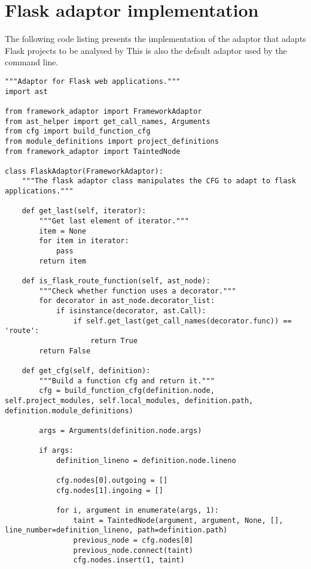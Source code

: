 \chapter{Flask adaptor implementation}\label{appendix:flask_adaptor}
The following code listing presents the implementation of the adaptor that adapts Flask projects to be analysed by \pyt{}
This is also the default adaptor used by the \pyt{} command line.

\begin{lstlisting}[style=python, caption={Implementation of the Flask adaptor}, label={flask_adaptor_implementation}]
"""Adaptor for Flask web applications."""
import ast

from framework_adaptor import FrameworkAdaptor
from ast_helper import get_call_names, Arguments
from cfg import build_function_cfg
from module_definitions import project_definitions
from framework_adaptor import TaintedNode

class FlaskAdaptor(FrameworkAdaptor):
    """The flask adaptor class manipulates the CFG to adapt to flask applications."""

    def get_last(self, iterator):
        """Get last element of iterator."""
        item = None
        for item in iterator:
            pass
        return item

    def is_flask_route_function(self, ast_node):
        """Check whether function uses a decorator."""
        for decorator in ast_node.decorator_list:
            if isinstance(decorator, ast.Call):
                if self.get_last(get_call_names(decorator.func)) == 'route':
                    return True
        return False

    def get_cfg(self, definition):
        """Build a function cfg and return it."""
        cfg = build_function_cfg(definition.node, self.project_modules, self.local_modules, definition.path, definition.module_definitions)

        args = Arguments(definition.node.args)

        if args:
            definition_lineno = definition.node.lineno

            cfg.nodes[0].outgoing = [] 
            cfg.nodes[1].ingoing = []
            
            for i, argument in enumerate(args, 1):
                taint = TaintedNode(argument, argument, None, [], line_number=definition_lineno, path=definition.path)
                previous_node = cfg.nodes[0]
                previous_node.connect(taint)
                cfg.nodes.insert(1, taint)


\end{lstlisting}
